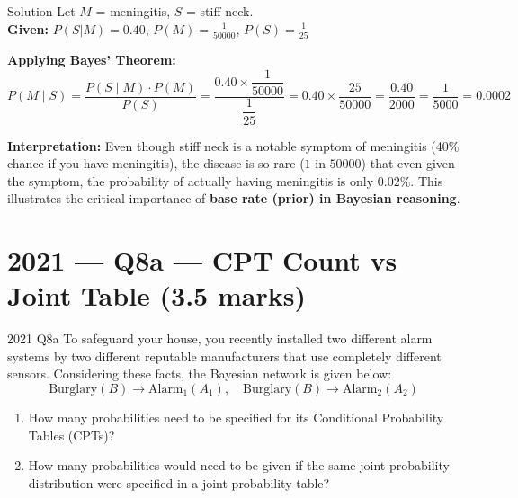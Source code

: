 \documentclass[12pt,a4paper]{article}
\begin{document}
\begin{solbox}{Solution}
Let $M$ = meningitis, $S$ = stiff neck.\\
\textbf{Given:} $P(S|M)=0.40$, $P(M)=\frac{1}{50000}$, $P(S)=\frac{1}{25}$

\textbf{Applying Bayes' Theorem:}
\[
P(M \mid S) = \frac{P(S \mid M)\cdot P(M)}{P(S)}
= \frac{0.40 \times \dfrac{1}{50000}}{\dfrac{1}{25}}
= 0.40 \times \frac{25}{50000}
= \frac{0.40}{2000}
= \boxed{\frac{1}{5000} = 0.0002}
\]

\textbf{Interpretation:} Even though stiff neck is a notable symptom of meningitis (40\% chance if you have meningitis), the disease is so rare ($1$ in $50000$) that even given the symptom, the probability of actually having meningitis is only $\mathbf{0.02\%}$. This illustrates the critical importance of \textbf{base rate (prior) in Bayesian reasoning}.
\end{solbox}

\newpage
\section{2021 --- Q8a --- CPT Count vs Joint Table (3.5 marks)}

\begin{qbox}{2021 Q8a}
To safeguard your house, you recently installed two different alarm systems by two different reputable manufacturers that use completely different sensors. Considering these facts, the Bayesian network is given below:
\[
\text{Burglary} (B) \longrightarrow \text{Alarm}_1 (A_1), \quad \text{Burglary} (B) \longrightarrow \text{Alarm}_2 (A_2)
\]
\begin{enumerate}[label=(\roman*)]
  \item How many probabilities need to be specified for its Conditional Probability Tables (CPTs)?
  \item How many probabilities would need to be given if the same joint probability distribution were specified in a joint probability table?
\end{enumerate}
\end{qbox}
\end{document}

